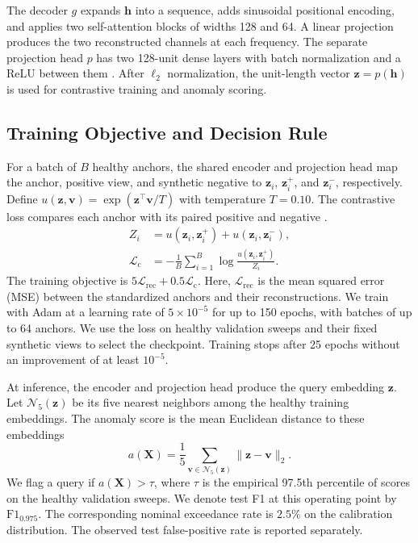 \documentclass[journal]{IEEEtran}
\newcommand{\Fmain}{\mathrm{F1}_{0.975}}
\begin{document}
The decoder $g$ expands $\mathbf h$ into a sequence, adds sinusoidal positional encoding, and applies two self-attention blocks of widths 128 and 64. A linear projection produces the two reconstructed channels at each frequency. The separate projection head $p$ has two 128-unit dense layers with batch normalization and a ReLU between them \cite{chen2020simclr}. After $\ell_2$ normalization, the unit-length vector $\mathbf z=p(\mathbf h)$ is used for contrastive training and anomaly scoring.

\subsection{Training Objective and Decision Rule}\label{sec:4_4}

For a batch of $B$ healthy anchors, the shared encoder and projection head map the anchor, positive view, and synthetic negative to $\mathbf z_i$, $\mathbf z_i^+$, and $\mathbf z_i^-$, respectively. Define $u(\mathbf z,\mathbf v)=\exp(\mathbf z^\top\mathbf v/T)$ with temperature $T=0.10$. The contrastive loss compares each anchor with its paired positive and negative \cite{oord2018representation}.
\begin{align}
Z_i &= u(\mathbf z_i,\mathbf z_i^+)+u(\mathbf z_i,\mathbf z_i^-),\\
\mathcal L_{\mathrm c}
 &= -\frac{1}{B}\sum_{i=1}^B\log\frac{u(\mathbf z_i,\mathbf z_i^+)}{Z_i}.
\end{align}
The training objective is $5\mathcal L_{\mathrm{rec}}+0.5\mathcal L_{\mathrm c}$. Here, $\mathcal L_{\mathrm{rec}}$ is the mean squared error (MSE) between the standardized anchors and their reconstructions. We train with Adam \cite{kingma2015adam} at a learning rate of $5\times10^{-5}$ for up to 150 epochs, with batches of up to 64 anchors. We use the loss on healthy validation sweeps and their fixed synthetic views to select the checkpoint. Training stops after 25 epochs without an improvement of at least $10^{-5}$.

At inference, the encoder and projection head produce the query embedding $\mathbf z$. Let $\mathcal N_5(\mathbf z)$ be its five nearest neighbors among the healthy training embeddings. The anomaly score is the mean Euclidean distance to these embeddings
\begin{equation}
\label{eq:knn_score}
a(\mathbf X)=\frac{1}{5}\sum_{\mathbf v\in\mathcal N_5(\mathbf z)}
\|\mathbf z-\mathbf v\|_2.
\end{equation}
We flag a query if $a(\mathbf X)>\tau$, where $\tau$ is the empirical 97.5th percentile of scores on the healthy validation sweeps. We denote test F1 at this operating point by $\Fmain$. The corresponding nominal exceedance rate is $2.5\%$ on the calibration distribution. The observed test false-positive rate is reported separately.
\end{document}
